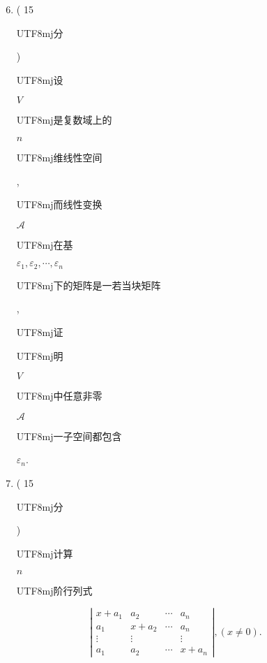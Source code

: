 \documentclass[10pt]{article}
\begin{document}
\begin{enumerate}
  \setcounter{enumi}{5}
  \item ( 15 \begin{CJK}{UTF8}{mj}分\end{CJK}) \begin{CJK}{UTF8}{mj}设\end{CJK} $V$ \begin{CJK}{UTF8}{mj}是复数域上的\end{CJK} $n$ \begin{CJK}{UTF8}{mj}维线性空间\end{CJK}, \begin{CJK}{UTF8}{mj}而线性变换\end{CJK} $\mathscr{A}$ \begin{CJK}{UTF8}{mj}在基\end{CJK} $\varepsilon_{1}, \varepsilon_{2}, \cdots, \varepsilon_{n}$ \begin{CJK}{UTF8}{mj}下的矩阵是一若当块矩阵\end{CJK}, \begin{CJK}{UTF8}{mj}证\end{CJK} \begin{CJK}{UTF8}{mj}明\end{CJK} $V$ \begin{CJK}{UTF8}{mj}中任意非零\end{CJK} $\mathscr{A}$ \begin{CJK}{UTF8}{mj}一子空间都包含\end{CJK} $\varepsilon_{n}$.

  \item ( 15 \begin{CJK}{UTF8}{mj}分\end{CJK}) \begin{CJK}{UTF8}{mj}计算\end{CJK} $n$ \begin{CJK}{UTF8}{mj}阶行列式\end{CJK}

\end{enumerate}
$$
\left|\begin{array}{cccc}
x+a_{1} & a_{2} & \cdots & a_{n} \\
a_{1} & x+a_{2} & \cdots & a_{n} \\
\vdots & \vdots & & \vdots \\
a_{1} & a_{2} & \cdots & x+a_{n}
\end{array}\right|,(x \neq 0) .
$$
\end{document}
